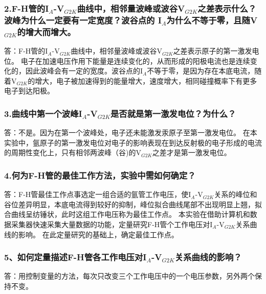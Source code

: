 \documentclass[12pt,a4paper,UTF8]{ctexart}
\begin{document}
	\subsubsection*{2.F-H管的I$_{A}$-V$_{G2K}$曲线中，相邻量波峰或波谷V$_{G2K}$之差表示什么？波峰为什么一定要有一定宽度？波谷点的 I$_A$为什么不等于零，且随V$_{G2K}$的增大而增大。}
	答：F-H管的I$_{A}$-V$_{G2K}$曲线中，相邻量波峰或波谷V$_{G2K}$之差表示原子的第一激发电位。
	电子在加速电压作用下能量是连续变化的，从而形成的阳极电流也是连续变化的，因此波峰会有一定的宽度。波谷点的I$_A$不等于零，是因为存在本底电流，随着V$_{G2K}$的增大，电子被加速得到的能量增大，速度增大，相同碰撞概率下有更多电子到达阳极。

	\subsubsection*{3.曲线中第一个波峰I$_{A}$-V$_{G2K}$是否就是第一激发电位？为什么？}
	答：不是。因为在第一个波峰处，电子还未能激发汞原子至第一激发电位。
	在本实验中，氩原子的第一激发电位对电子的影响表现在到达反射极的电子形成的电流的周期性变化上，只有相邻两波峰（谷)的V$_{G2K}$之差才是第一激发电位。

	\subsubsection*{4.何为F-H管的最佳工作方法，实验中需如何确定？}
	答：F-H管最佳工作点事选定一组合适的氩管工作电压，使I$_{A}$-V$_{G2K}$关系的峰位和谷位差异明显，本底电流得到较好的抑制，峰位拟合曲线尾部不出现明显上翘，拟合曲线呈纺锤状，此时这组工作电压称为最佳工作点。
	本实验在借助计算机和数据采集器快速采集大量数据的功能，定量研究F-H管个工作电压对I$_{A}$-V$_{G2K}$关系曲线的影响。
	在此定量研究的基础上，确定最佳工作点。

	\subsubsection*{5、如何定量描述F-H管各工作电压对I$_{A}$-V$_{G2K}$关系曲线的影响？}
	答：用控制变量的方法，每次只改变三个工作电压中的一个电压参数，另外两个保持不变。
\end{document}
